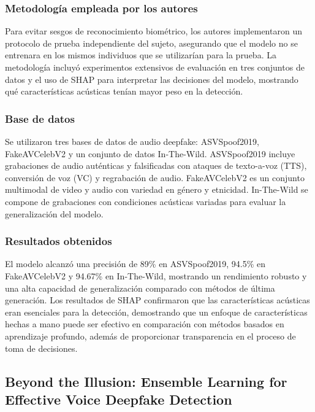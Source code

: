 \subsubsection{Metodología empleada por los autores}
Para evitar sesgos de reconocimiento biométrico, los autores implementaron un protocolo de prueba independiente del sujeto, asegurando que el modelo no se entrenara en los mismos individuos que se utilizarían para la prueba. La metodología incluyó experimentos extensivos de evaluación en tres conjuntos de datos y el uso de SHAP para interpretar las decisiones del modelo, mostrando qué características acústicas tenían mayor peso en la detección.

\subsubsection{Base de datos}
Se utilizaron tres bases de datos de audio deepfake: ASVSpoof2019, FakeAVCelebV2 y un conjunto de datos In-The-Wild. ASVSpoof2019 incluye grabaciones de audio auténticas y falsificadas con ataques de texto-a-voz (TTS), conversión de voz (VC) y regrabación de audio. FakeAVCelebV2 es un conjunto multimodal de video y audio con variedad en género y etnicidad. In-The-Wild se compone de grabaciones con condiciones acústicas variadas para evaluar la generalización del modelo.

\subsubsection{Resultados obtenidos}
El modelo alcanzó una precisión de 89\% en ASVSpoof2019, 94.5\% en FakeAVCelebV2 y 94.67\% en In-The-Wild, mostrando un rendimiento robusto y una alta capacidad de generalización comparado con métodos de última generación. Los resultados de SHAP confirmaron que las características acústicas eran esenciales para la detección, demostrando que un enfoque de características hechas a mano puede ser efectivo en comparación con métodos basados en aprendizaje profundo, además de proporcionar transparencia en el proceso de toma de decisiones.

\subsection{Beyond the Illusion: Ensemble Learning for Effective Voice Deepfake Detection \citep*{pr_dehghani2018copper}}

